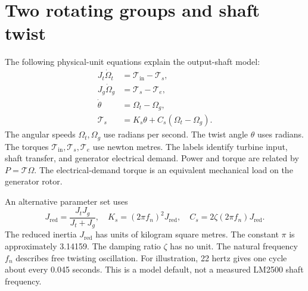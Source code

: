 \documentclass[11pt,a4paper]{report}
\begin{document}
\section{Two rotating groups and shaft twist}
The following physical-unit equations explain the output-shaft model:
\begin{align}
J_t\dot\Omega_t&=\mathcal{T}_{\mathrm{in}}-\mathcal{T}_s,\\
J_g\dot\Omega_g&=\mathcal{T}_s-\mathcal{T}_e,\\
\dot\theta&=\Omega_t-\Omega_g,\\
\mathcal{T}_s&=K_s\theta+C_s(\Omega_t-\Omega_g).
\label{eq:shaft-physical}
\end{align}
The angular speeds $\Omega_t,\Omega_g$ use radians per second.
The twist angle $\theta$ uses radians.
The torques $\mathcal{T}_{\mathrm{in}},\mathcal{T}_s,\mathcal{T}_e$ use newton metres.
The labels identify turbine input, shaft transfer, and generator electrical demand.
Power and torque are related by $P=\mathcal{T}\Omega$.
The electrical-demand torque is an equivalent mechanical load on the generator rotor.

An alternative parameter set uses
\begin{equation}
J_{\mathrm{red}}=\frac{J_tJ_g}{J_t+J_g},\quad
K_s=(2\pi f_n)^2J_{\mathrm{red}},\quad
C_s=2\zeta(2\pi f_n)J_{\mathrm{red}}.
\end{equation}
The reduced inertia $J_{\mathrm{red}}$ has units of kilogram square metres.
The constant $\pi$ is approximately 3.14159.
The damping ratio $\zeta$ has no unit.
The natural frequency $f_n$ describes free twisting oscillation.
For illustration, 22 hertz gives one cycle about every 0.045 seconds.
This is a model default, not a measured LM2500 shaft frequency.
\end{document}
